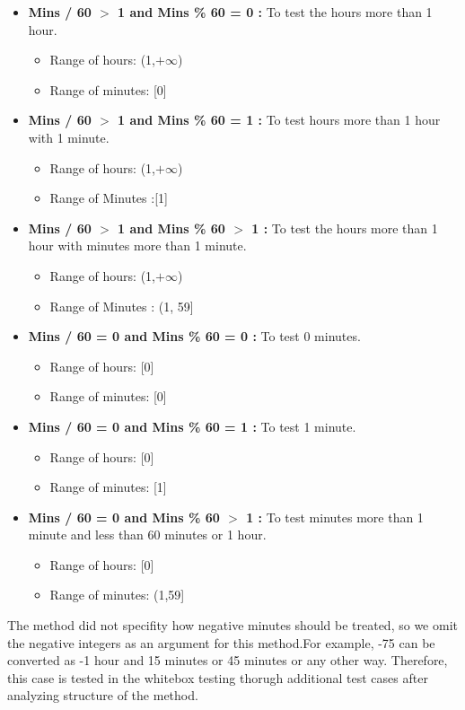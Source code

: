 \documentclass[fontsize=12pt,paper=letter,twoside]{scrartcl}
\begin{document}
\begin{itemize}
\begin{itemize}
\item \textbf{ Mins / 60 $>$ 1 and Mins \% 60 = 0 :} To test the hours more than 1 hour.
 \begin{itemize}
 \item Range of hours: (1,$+\infty$)
 \item Range of minutes: [0]
\end{itemize}
\item \textbf{ Mins / 60 $>$ 1 and Mins \% 60 = 1 :} To test hours more than 1 hour with 1 minute. 
 \begin{itemize}
 \item Range of hours: (1,$+\infty$)
\item Range of Minutes :[1]
\end{itemize}
\item \textbf{ Mins / 60 $>$ 1 and Mins \% 60 $>$ 1 :} To test the hours more than 1 hour with minutes more than 1 minute. 
 \begin{itemize}
 \item Range of hours:  (1,$+\infty$) 
\item Range of Minutes : (1, 59]
\end{itemize}
\item \textbf{ Mins / 60 = 0 and Mins \% 60 = 0 :} To test 0 minutes.
 \begin{itemize}
 \item Range of hours: [0]
 \item Range of minutes: [0]
\end{itemize}
\item \textbf{ Mins / 60 = 0 and Mins \% 60 = 1 :} To test 1 minute.
 \begin{itemize}
 \item Range of hours: [0]
 \item Range of minutes: [1]
\end{itemize}
\item \textbf{ Mins / 60 = 0 and Mins \% 60 $>$ 1 :} To test minutes more than 1 minute and less than 60 minutes or 1 hour.
 \begin{itemize}
 \item Range of hours: [0]
 \item Range of minutes: (1,59]
\end{itemize}
\end{itemize}
The method did not specifity how negative minutes should be treated, so we omit  the negative integers as an argument for this method.For example, -75 can be converted as -1 hour and 15 minutes or 45 minutes or any other way. Therefore, this case is tested in the whitebox testing thorugh additional test cases after analyzing structure of the method.


\end{itemize}
\end{document}
